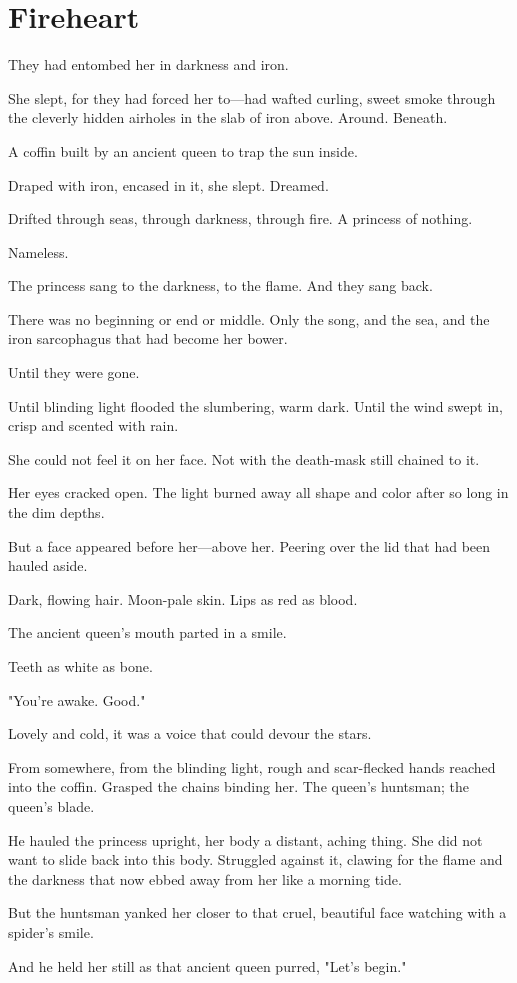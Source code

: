 
\chapter*{Fireheart}

They had entombed her in darkness and iron.

She slept, for they had forced her to---had wafted curling, sweet smoke through the cleverly hidden airholes in the slab of iron above. Around. Beneath.

A coffin built by an ancient queen to trap the sun inside.

Draped with iron, encased in it, she slept. Dreamed.

Drifted through seas, through darkness, through fire. A princess of nothing.

Nameless.

The princess sang to the darkness, to the flame. And they sang back.

There was no beginning or end or middle. Only the song, and the sea, and the iron sarcophagus that had become her bower.

Until they were gone.

Until blinding light flooded the slumbering, warm dark. Until the wind swept in, crisp and scented with rain.

She could not feel it on her face. Not with the death-mask still chained to it.

Her eyes cracked open. The light burned away all shape and color after so long in the dim depths.

But a face appeared before her---above her. Peering over the lid that had been hauled aside.

Dark, flowing hair. Moon-pale skin. Lips as red as blood.

The ancient queen's mouth parted in a smile.

Teeth as white as bone.

"You're awake. Good."

Lovely and cold, it was a voice that could devour the stars.

From somewhere, from the blinding light, rough and scar-flecked hands reached into the coffin. Grasped the chains binding her. The queen's huntsman; the queen's blade.

He hauled the princess upright, her body a distant, aching thing. She did not want to slide back into this body. Struggled against it, clawing for the flame and the darkness that now ebbed away from her like a morning tide.

But the huntsman yanked her closer to that cruel, beautiful face watching with a spider's smile.

And he held her still as that ancient queen purred, "Let's begin."

